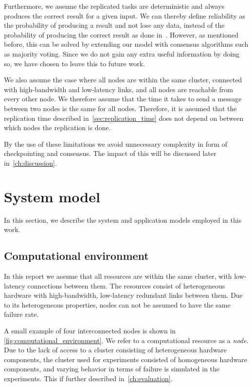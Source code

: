 \documentclass{cslthse-msc}
\begin{document}
Furthermore, we assume the replicated tasks are deterministic and always produces the correct result for a given input. We can thereby define reliability as the probability of producing a result and not lose any data, instead of the probability of producing the correct result as done in~\cite{selfAdaptRel, dynAdaptRepl, relModelWebServices}. However, as mentioned before, this can be solved by extending our model with consensus algorithms such as majority voting. Since we do not gain any extra useful information by doing so, we have chosen to leave this to future work.

We also assume the case where all nodes are within the same cluster, connected with high-bandwidth and low-latency links, and all nodes are reachable from every other node. We therefore assume that the time it takes to send a message between two nodes is the same for all nodes. Therefore, it is assumed that the replication time described in~\cref{sec:replication_time} does not depend on between which nodes the replication is done.

By the use of these limitations we avoid unnecessary complexity in form of checkpointing and consensus. The impact of this will be discussed later in~\cref{ch:discussion}.

\section{System model} \label{sec:design_system_model}
In this section, we describe the system and application models employed in this work.

\subsection{Computational environment} \label{subsec:design_comp_env}
In this report we assume that all resources are within the same cluster, with low-latency connections between them. The resources consist of heterogeneous hardware with high-bandwidth, low-latency redundant links between them. Due to its heterogeneous properties, nodes can not be assumed to have the same failure rate.

A small example of four interconnected nodes is shown in \cref{fig:computational_environment}. We refer to a computational resource as a \emph{node}. Due to the lack of access to a cluster consisting of heterogeneous hardware components, the cluster used for experiments consisted of homogeneous hardware components, and varying behavior in terms of failure is simulated in the experiments. This if further described in~\cref{ch:evaluation}.
\end{document}
